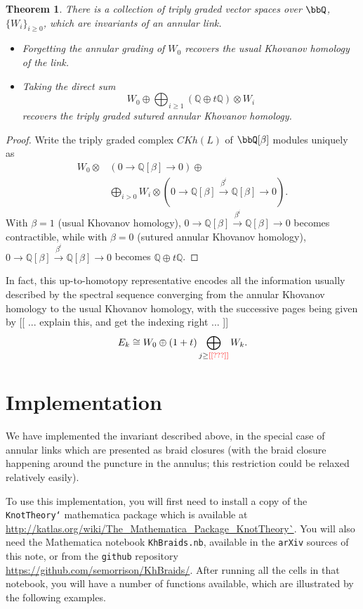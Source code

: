 \documentclass{amsart}
\theoremstyle{plain}
\newtheorem{thm}[prop]{Theorem}
\newcommand{\nn}[1]{{\color{red} [[ #1 ]]}}
\newcommand{\complexzero}{0\rightarrow\mathbb Q [\beta]\rightarrow 0}
\newcommand{\complexk}[1]{0\rightarrow\mathbb Q [\beta]\xrightarrow{\beta^{#1}}{}\mathbb Q [\beta]\rightarrow 0}
\begin{document}
\begin{thm}
There is a collection of triply graded vector spaces over $\bbQ$, $\{W_i\}_{i \geq 0}$, which are invariants of an annular link.
\begin{itemize}
\item Forgetting the annular grading of $W_0$ recovers the usual Khovanov homology of the link.
\item Taking the direct sum $$W_0 \oplus \bigoplus_{i \geq 1} (\mathbb Q \oplus t \mathbb Q) \otimes W_i$$ recovers the triply graded sutured annular Khovanov homology.
\end{itemize}
\end{thm}
\begin{proof}
Write the triply graded complex $CKh(L)$ of $\bbQ[\beta]$ modules uniquely as 
\begin{align*}
W_0 \otimes & \left(\complexzero\right) \oplus \\
            & \bigoplus_{i > 0} W_i \otimes \left( \complexk{i} \right).
\end{align*}
With $\beta = 1$ (usual Khovanov homology), $\complexk{i}$ becomes contractible, while with $\beta = 0$ (sutured annular Khovanov homology), $\complexk{i}$ becomes $\mathbb Q \oplus t \mathbb Q$.
\end{proof}

In fact, this up-to-homotopy representative encodes all the information usually described by the spectral sequence converging from the annular Khovanov homology to the usual Khovanov homology, with the successive pages being given by \nn{... explain this, and get the indexing right ...}
$$E_k \cong W_0 \oplus (1+t) \bigoplus_{j \geq \nn{???}} W_k.$$

\section{Implementation}
We have implemented the invariant described above, in the special case of annular links which are presented as braid closures (with the braid closure happening around the puncture in the annulus; this restriction could be relaxed relatively easily).

To use this implementation, you will first need to install a copy of the {\tt KnotTheory`} mathematica package which is available at \url{http://katlas.org/wiki/The_Mathematica_Package_KnotTheory`}. You will also need the Mathematica notebook {\tt KhBraids.nb}, available 
in the {\tt arXiv} sources of this note, or from
the {\tt github} repository \url{https://github.com/semorrison/KhBraids/}. After running all the cells in that notebook, you will have a number of functions available, which are illustrated by the following examples.
\end{document}
